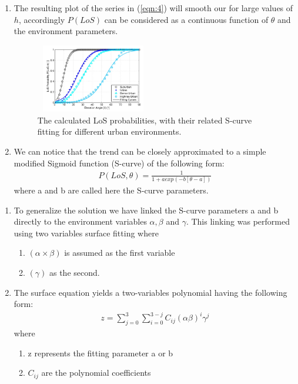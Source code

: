 \documentclass{beamer}
\begin{document}
\begin{frame}{}
    \begin{enumerate}
    \item The resulting plot of the series in (\ref{eqn:4}) will smooth our for large values of $h$, accordingly $P(LoS)$ can be considered as a continuous function of $\theta$ and the environment parameters.
        \begin{figure}
    \centering
    \includegraphics[width=5cm, height=3cm]{Figures/Figure2.png}
    \caption{The calculated LoS probabilities, with their related S-curve
fitting for different urban environments.}
    \label{fig:2}
\end{figure}
        
        \item We can notice that the trend can be closely approximated to a simple   modified Sigmoid function (S-curve) of the following form:
        \begin{align}
            P(LoS, \theta) = \frac{1}{ 1 + aexp (- b\left[\theta -  a\right])}
            \label{eqn:5}
        \end{align}
        where a and b are called here the S-curve parameters.
    \end{enumerate}

\end{frame}
\begin{frame}{}

\begin{enumerate}
    \item To generalize the solution we have linked the S-curve parameters a and b directly to the environment variables $\alpha, \beta$ and $\gamma$. This linking was performed using two variables surface fitting 
where 
\begin{enumerate}
    \item $(\alpha \times \beta)$ is assumed as the first variable
\item $(\gamma)$ as the second. 
\end{enumerate}
    \item The surface equation yields a two-variables polynomial having the following form:
    \begin{align}
        z = \sum_{j=0}^{3}  \sum_{i=0}^{3-j} C_{ij}(\alpha \beta)^i \gamma^j
        \label{eqn:6}
    \end{align}
    where 
    \begin{enumerate}
        \item z represents the fitting parameter a or b
        \item $C_{ij}$ are the polynomial coefficients
    \end{enumerate}


\end{enumerate}

    
\end{frame}
\end{document}
